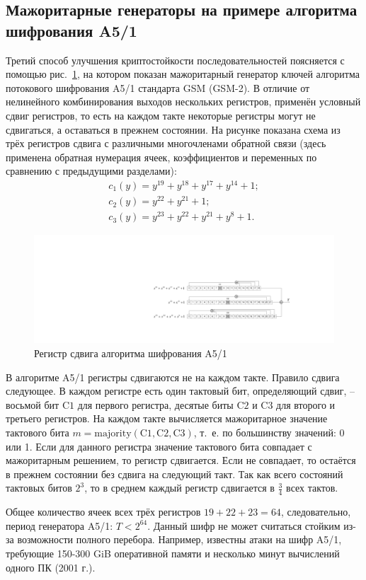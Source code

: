 \subsection[Мажоритарные генераторы, шифр A5/1]{Мажоритарные генераторы на примере алгоритма шифрования A5/1}

Третий способ улучшения криптостойкости последовательностей поясняется с помощью рис.~\ref{fig:gsm-a51-cipher}, на котором показан мажоритарный генератор ключей алгоритма потокового шифрования A5/1 стандарта GSM (GSM-2). В отличие от нелинейного комбинирования выходов нескольких регистров, применён условный сдвиг регистров, то есть на каждом такте некоторые регистры могут не сдвигаться, а оставаться в прежнем состоянии. На рисунке показана схема из трёх регистров сдвига с различными многочленами обратной связи (здесь применена обратная нумерация ячеек, коэффициентов и переменных по сравнению с предыдущими разделами):
\[ \begin{array}{l}
    c_1(y) = y^{19} + y^{18} + y^{17} + y^{14} + 1; \\
    c_2(y) = y^{22} + y^{21} + 1; \\
    c_3(y) = y^{23} + y^{22} + y^{21} + y^8 + 1.
\end{array} \]

\begin{figure}[!ht]
    \centering
	\includegraphics[width=\textwidth]{pic/gsm-a51-cipher}
    \caption{Регистр сдвига алгоритма шифрования A5/1\label{fig:gsm-a51-cipher}}
\end{figure}

В алгоритме A5/1 регистры сдвигаются не на каждом такте. Правило сдвига следующее. В каждом регистре есть один тактовый бит, определяющий сдвиг,  -- восьмой бит $\textrm{C1}$ для первого регистра, десятые биты $\textrm{C2}$ и $\textrm{C3}$ для второго и третьего регистров. На каждом такте вычисляется мажоритарное значение тактового бита $m = \textrm{majority}(\textrm{C1}, \textrm{C2}, \textrm{C3})$, т.~е. по большинству значений: 0 или 1. Если для данного регистра значение тактового бита совпадает с мажоритарным решением, то регистр сдвигается. Если не совпадает, то остаётся в прежнем состоянии без сдвига на следующий такт. Так как всего состояний тактовых битов $2^3$, то в среднем каждый регистр сдвигается в $\frac{3}{4}$ всех тактов.

Общее количество ячеек всех трёх регистров $19+22+23=64$, следовательно, период генератора A5/1: $T < 2^{64}$. Данный шифр не может считаться стойким из-за возможности полного перебора. Например, известны атаки на шифр A5/1, требующие 150-300 GiB оперативной памяти и несколько минут вычислений одного ПК (2001 г.).
